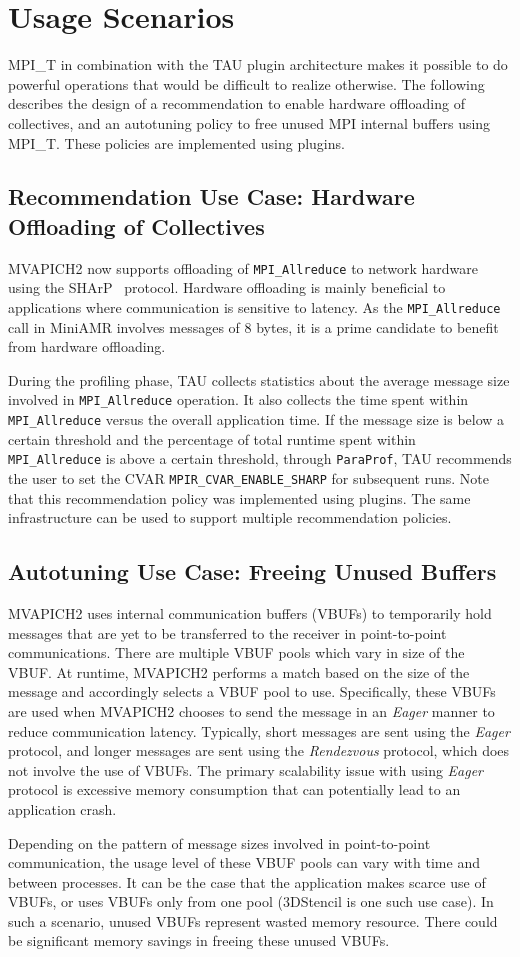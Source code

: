 \section{Usage Scenarios}
MPI\_T in combination with the TAU plugin architecture makes it possible to do powerful operations that would be difficult to realize otherwise. The following describes the design of a recommendation to enable hardware offloading of collectives, and an autotuning policy to free unused MPI internal buffers using MPI\_T. These policies are implemented using plugins.
\subsection{Recommendation Use Case: Hardware Offloading of Collectives}
MVAPICH2 now supports offloading of \verb+MPI_Allreduce+ to network hardware using the SHArP~\cite{SHARP} protocol. Hardware offloading is mainly beneficial to applications where communication is sensitive to latency. As the \verb+MPI_Allreduce+ call in MiniAMR involves messages of 8 bytes, it is a prime candidate to benefit from hardware offloading. \par
During the profiling phase, TAU collects statistics about the average message size involved in \verb+MPI_Allreduce+ operation. It also collects the time spent within \verb+MPI_Allreduce+ versus the overall application time. If the message size is below a certain threshold and the percentage of total runtime spent within \verb+MPI_Allreduce+ is above a certain threshold, through \verb+ParaProf+, TAU recommends the user to set the CVAR \verb+MPIR_CVAR_ENABLE_SHARP+ for subsequent runs. Note that this recommendation policy was implemented using plugins. The same infrastructure can be used to support multiple recommendation policies.
\subsection{Autotuning Use Case: Freeing Unused Buffers}
MVAPICH2 uses internal communication buffers (VBUFs) to temporarily hold messages that are yet to be transferred to the receiver in point-to-point communications. There are multiple VBUF pools which vary in size of the VBUF. At runtime, MVAPICH2 performs a match based on the size of the message and accordingly selects a VBUF pool to use. Specifically, these VBUFs are used when MVAPICH2 chooses to send the message in an \emph{Eager} manner to reduce communication latency. Typically, short messages are sent using the \emph{Eager} protocol, and longer messages are sent using the \emph{Rendezvous} protocol, which does not involve the use of VBUFs. The primary scalability issue with using \emph{Eager} protocol is excessive memory consumption that can potentially lead to an application crash. \par
Depending on the pattern of message sizes involved in point-to-point communication, the usage level of these VBUF pools can vary with time and between processes. It can be the case that the application makes scarce use of VBUFs, or uses VBUFs only from one pool (3DStencil is one such use case). In such a scenario, unused VBUFs represent wasted memory resource. There could be significant memory savings in freeing these unused VBUFs.

